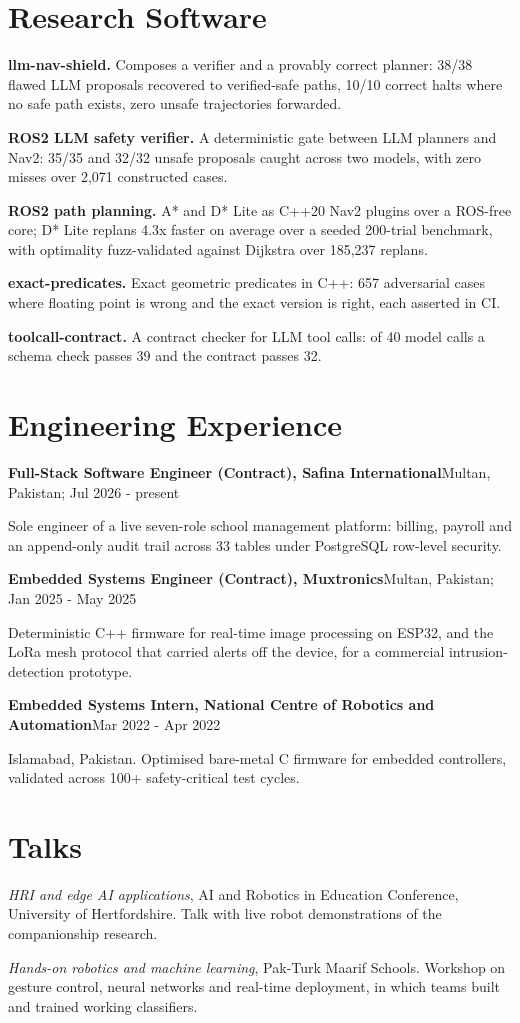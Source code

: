 \documentclass[10pt]{article}
\newcommand{\entry}[2]{{\textbf{#1}\hfill {\small #2}\par}}
\newcommand{\sub}[1]{{\small\color{dim}#1\par}}
\newcommand{\gap}{\vspace{4pt}}
\begin{document}
\section{Research Software}
{\small
\textbf{llm-nav-shield.} Composes a verifier and a provably correct planner: 38/38 flawed LLM proposals recovered to
verified-safe paths, 10/10 correct halts where no safe path exists, zero unsafe trajectories forwarded.\par\gap
\textbf{ROS2 LLM safety verifier.} A deterministic gate between LLM planners and Nav2: 35/35 and 32/32 unsafe
proposals caught across two models, with zero misses over 2,071 constructed cases.\par\gap
\textbf{ROS2 path planning.} A* and D* Lite as C++20 Nav2 plugins over a ROS-free core; D* Lite replans 4.3x faster on
average over a seeded 200-trial benchmark, with optimality fuzz-validated against Dijkstra over 185,237 replans.\par\gap
\textbf{exact-predicates.} Exact geometric predicates in C++: 657 adversarial cases where floating point is wrong and
the exact version is right, each asserted in CI.\par\gap
\textbf{toolcall-contract.} A contract checker for LLM tool calls: of 40 model calls a schema check passes 39 and the
contract passes 32.}

\section{Engineering Experience}
\entry{Full-Stack Software Engineer (Contract), Safina International}{Multan, Pakistan; Jul 2026 - present}
\sub{Sole engineer of a live seven-role school management platform: billing, payroll and an append-only audit trail
across 33 tables under PostgreSQL row-level security.}
\gap
\entry{Embedded Systems Engineer (Contract), Muxtronics}{Multan, Pakistan; Jan 2025 - May 2025}
\sub{Deterministic C++ firmware for real-time image processing on ESP32, and the LoRa mesh protocol that carried alerts
off the device, for a commercial intrusion-detection prototype.}
\gap
\entry{Embedded Systems Intern, National Centre of Robotics and Automation}{Mar 2022 - Apr 2022}
\sub{Islamabad, Pakistan. Optimised bare-metal C firmware for embedded controllers, validated across 100+ safety-critical test cycles.}

\section{Talks}
{\small
\emph{HRI and edge AI applications}, AI and Robotics in Education Conference, University of Hertfordshire. Talk with live
robot demonstrations of the companionship research.\par\gap
\emph{Hands-on robotics and machine learning}, Pak-Turk Maarif Schools. Workshop on gesture control, neural networks
and real-time deployment, in which teams built and trained working classifiers.}
\end{document}
